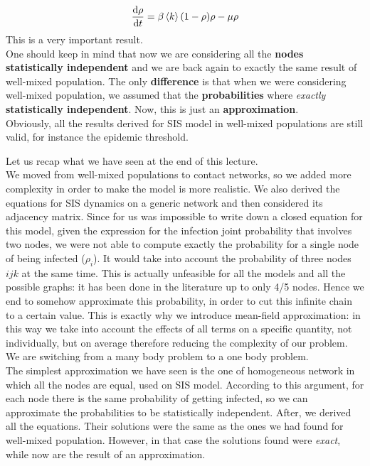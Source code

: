 \documentclass[../main/main.tex]{subfiles}
\begin{document}
\begin{equation}
  \dv{\rho }{t} = \beta \expval{k} (1- \rho ) \rho - \mu \rho
\end{equation}
This is a very important result.\\
One should keep in mind that now we are considering all the \textbf{nodes statistically independent} and we are back again to exactly the same result of well-mixed population. The only \textbf{difference} is that when we were considering well-mixed population, we assumed that the \textbf{probabilities} where \emph{exactly} \textbf{statistically independent}. Now, this is just an \textbf{approximation}.\\
Obviously, all the results derived for SIS model in well-mixed populations are still valid, for instance the epidemic threshold.

\begin{remark}
Let us recap what we have seen at the end of this lecture.\\
We moved from well-mixed populations to contact networks, so we added more complexity in order to make the model is more realistic. We also derived the equations for SIS dynamics on a generic network and then considered its adjacency matrix. Since for us was impossible to write down a closed equation for this model, given the expression for the infection joint probability that involves two nodes, we were not able to compute exactly the probability for a single node of being infected ($\rho_i$). It would take into account the probability of three nodes \( i j k \) at the same time. This is actually unfeasible for all the models and all the possible graphs: it has been done in the literature up to only 4/5 nodes. Hence we end to somehow approximate this probability, in order to cut this infinite chain to a certain value. This is exactly why we introduce mean-field approximation: in this way we take into account the effects of all terms on a specific quantity, not individually, but on average therefore reducing the complexity of our problem. We are switching from a many body problem to a one body problem.\\
The simplest approximation we have seen is the one of homogeneous network in which all the nodes are equal, used on SIS model. According to this argument, for each node there is the same probability of getting infected, so we can approximate the probabilities to be statistically independent. After, we derived all the equations. Their solutions were the same as the ones we had found for well-mixed population. However, in that case the solutions found were \textit{exact}, while now are the result of an approximation.
\end{remark}
\end{document}
